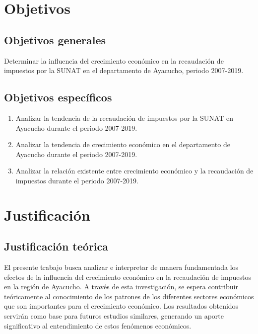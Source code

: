 \documentclass[
  letterpaper,
]{article}
\providecommand{\tightlist}{%
  \setlength{\itemsep}{0pt}\setlength{\parskip}{0pt}}\usepackage{longtable,booktabs,array}
\begin{document}
\hypertarget{objetivos}{%
\section{Objetivos}\label{objetivos}}

\hypertarget{objetivos-generales}{%
\subsection{Objetivos generales}\label{objetivos-generales}}

Determinar la influencia del crecimiento económico en la recaudación de
impuestos por la SUNAT en el departamento de Ayacucho, periodo
2007-2019.

\hypertarget{objetivos-especuxedficos}{%
\subsection{Objetivos específicos}\label{objetivos-especuxedficos}}

\begin{enumerate}
\def\labelenumi{\arabic{enumi}.}
\tightlist
\item
  Analizar la tendencia de la recaudación de impuestos por la SUNAT en
  Ayacucho durante el periodo 2007-2019.
\item
  Analizar la tendencia de crecimiento económico en el departamento de
  Ayacucho durante el periodo 2007-2019.
\item
  Analizar la relación existente entre crecimiento económico y la
  recaudación de impuestos durante el periodo 2007-2019.
\end{enumerate}

\hypertarget{justificaciuxf3n}{%
\section{Justificación}\label{justificaciuxf3n}}

\hypertarget{justificaciuxf3n-teuxf3rica}{%
\subsection{Justificación teórica}\label{justificaciuxf3n-teuxf3rica}}

El presente trabajo busca analizar e interpretar de manera fundamentada
los efectos de la influencia del crecimiento económico en la recaudación
de impuestos en la región de Ayacucho. A través de esta investigación,
se espera contribuir teóricamente al conocimiento de los patrones de los
diferentes sectores económicos que son importantes para el crecimiento
económico. Los resultados obtenidos servirán como base para futuros
estudios similares, generando un aporte significativo al entendimiento
de estos fenómenos económicos.
\end{document}
